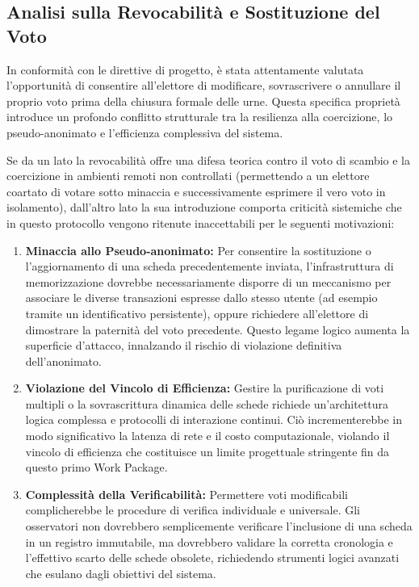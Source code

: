 \subsection*{Analisi sulla Revocabilità e Sostituzione del Voto}
In conformità con le direttive di progetto, è stata attentamente valutata l'opportunità di consentire all'elettore di modificare, sovrascrivere o annullare il proprio voto prima della chiusura formale delle urne. Questa specifica proprietà introduce un profondo conflitto strutturale tra la resilienza alla coercizione, lo pseudo-anonimato e l'efficienza complessiva del sistema.

Se da un lato la revocabilità offre una difesa teorica contro il voto di scambio e la coercizione in ambienti remoti non controllati (permettendo a un elettore coartato di votare sotto minaccia e successivamente esprimere il vero voto in isolamento), dall'altro lato la sua introduzione comporta criticità sistemiche che in questo protocollo vengono ritenute inaccettabili per le seguenti motivazioni:
\begin{enumerate}
    \item \textbf{Minaccia allo Pseudo-anonimato:} Per consentire la sostituzione o l'aggiornamento di una scheda precedentemente inviata, l'infrastruttura di memorizzazione dovrebbe necessariamente disporre di un meccanismo per associare le diverse transazioni espresse dallo stesso utente (ad esempio tramite un identificativo persistente), oppure richiedere all'elettore di dimostrare la paternità del voto precedente. Questo legame logico aumenta la superficie d'attacco, innalzando il rischio di violazione definitiva dell'anonimato.
    \item \textbf{Violazione del Vincolo di Efficienza:} Gestire la purificazione di voti multipli o la sovrascrittura dinamica delle schede richiede un'architettura logica complessa e protocolli di interazione continui. Ciò incrementerebbe in modo significativo la latenza di rete e il costo computazionale, violando il vincolo di efficienza che costituisce un limite progettuale stringente fin da questo primo Work Package.
    \item \textbf{Complessità della Verificabilità:} Permettere voti modificabili complicherebbe le procedure di verifica individuale e universale. Gli osservatori non dovrebbero semplicemente verificare l'inclusione di una scheda in un registro immutabile, ma dovrebbero validare la corretta cronologia e l'effettivo scarto delle schede obsolete, richiedendo strumenti logici avanzati che esulano dagli obiettivi del sistema.
\end{enumerate}

